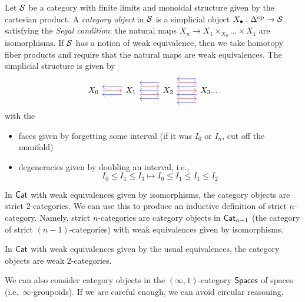 \begin{dfn}
	Let $\mathcal{S}$ be a category with finite limits and monoidal structure given by the cartesian product. 
	A \emph{category object} in $\mathcal{S}$ is a simplicial object $X_\bullet: \Delta^{\mathrm{op}} \to \mathcal{S}$ satisfying the \emph{Segal condition}: the natural maps $X_n \to X_1 \times_{X_0} \dots \times X_1$ are isomorphisms.
	If $\mathcal{S}$ has a notion of weak equivalence, then we take homotopy fiber products and require that the natural maps are weak equivalences.
	The simplicial structure is given by
	\begin{equation*}
		\begin{tikzcd}
			X_0 \arrow[r, purple] 
			&X_1 \arrow[l, shift left=2, blue] \arrow[l, shift right=2, blue] \arrow[r, shift left = 2, purple]  \arrow[r, purple, shift right=2] 
			&X_2 \arrow[l, shift left=4, blue] \arrow[l, shift right=4, blue] \arrow[l, blue] \arrow[r, shift left=4, purple] \arrow[r, shift right=4, purple] \arrow[r,purple] 
			&X_3... \arrow[l, shift left=2, blue] \arrow[l, shift right=2, blue] \arrow[l, shift left=6, blue] \arrow[l, shift right=6, blue]
		\end{tikzcd}
	\end{equation*}
	with the
	\begin{itemize} \color{blue}
		\item faces given by forgetting some interval (if it was $I_0$ or $I_n$, cut off the manifold) \color{purple}
		\item degeneracies given by doubling an interval, i.e.,
		$$I_0\leq I_1 \leq I_3 \mapsto I_0\leq I_1 \leq I_1 \leq I_2 $$
	\end{itemize}
\end{dfn}

\begin{ex}
	In $\mathsf{Cat}$ with weak equivalences given by isomorphisms, the category objects are strict 2-categories.
	We can use this to produce an inductive definition of strict $n$-category.
	Namely, strict $n$-categories are category objects in $\mathsf{Cat}_{n-1}$ (the category of strict $(n-1)$-categories) with weak equivalences given by isomorphisms.
\end{ex}

\begin{ex}
	In $\mathsf{Cat}$ with weak equivalences given by the usual equivalences, the category objects are weak 2-categories.
\end{ex}

We can also consider category objects in the $(\infty, 1)$-category $\mathsf{Spaces}$ of spaces (i.e.\ $\infty$-groupoids).
If we are careful enough, we can avoid circular reasoning.

